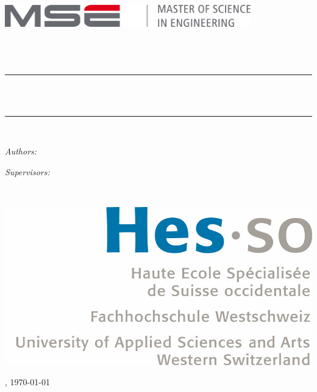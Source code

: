\documentclass[a4paper,11pt]{report}
\newcommand{\HRule}{\rule{\linewidth}{0.5mm}}
\begin{document}
\begin{titlepage}
    \begin{center}

        \includegraphics[width=0.8\textwidth]{img/mse_logo}~\\[1.5cm]
        \textsc{\Large \School}\\[0.25cm]
        \textsc{\Large \Faculty}\\[1.5cm]
        \textsc{\LARGE \Course}\\[0.5cm]

        \HRule \\[0.4cm]
        { \huge \bfseries \Title\\[0.4cm] }
        \HRule \\[1.5cm]

        \begin{minipage}[t]{0.4\textwidth}
            \begin{flushleft} \Large
                \emph{Authors:}\\ \Authors
            \end{flushleft}
        \end{minipage}
        \begin{minipage}[t]{0.4\textwidth}
            \begin{flushright} \Large
                \emph{Supervisors:}\\\Supervisors
            \end{flushright}
        \end{minipage}~\\[1.5cm]

        \begin{center}
            \includegraphics[scale=0.7]{img/logo_hes-so}
        \end{center}

        \vfill

        {\large \Place, \today}

    \end{center}
\end{titlepage}
\end{document}
